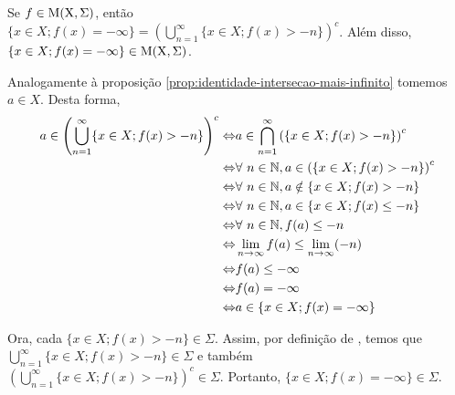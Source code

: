     \begin{proposition}
    \label{prop:identidade-união-menos-infinito}
        Se $f \in \operatorname{M(X, \Sigma)}$, então $\{x \in X; f(x) = -\infty\} = \displaystyle \left(\bigcup_{n = 1}^\infty \{x \in X; f(x) > - n\}\right)^c$.
        Além disso, $\{x \in X; f(x) = -\infty\} \in \operatorname{M(X, \Sigma)}$.
    \end{proposition}

    \begin{prova}
        Analogamente à proposição \ref{prop:identidade-intersecao-mais-infinito} tomemos $a \in X$. 
        Desta forma, 
        \begin{align*}
            a \in \left(\bigcup_{n = 1}^\infty \{x \in X; f(x) > - n\}\right)^c
            \Leftrightarrow & a \in \bigcap_{n = 1}^\infty \left(\{x \in X; f(x) > - n\}\right)^c\\
            \Leftrightarrow & \forall \ n \in \operatorname{\mathbb{N}}, a \in \left(\{x \in X; f(x) > - n\}\right)^c\\
            \Leftrightarrow & \forall \ n \in \operatorname{\mathbb{N}}, a \notin \{x \in X; f(x) > - n\}\\
            \Leftrightarrow & \forall \ n \in \operatorname{\mathbb{N}}, a \in \{x \in X; f(x) \leq - n\}\\
            \Leftrightarrow & \forall \ n \in \operatorname{\mathbb{N}}, f(a) \leq - n\\
            \Leftrightarrow & \lim_{n \to \infty} f(a) \leq \lim_{n \to \infty} (- n)\\            
            \Leftrightarrow & f(a) \leq -\infty\\            
            \Leftrightarrow & f(a) = -\infty\\            
            \Leftrightarrow & a \in \{x \in X; f(x) = -\infty\}            
        \end{align*}
        
    Ora, cada $\{x \in X; f(x) > - n\} \in \Sigma$.
    Assim, por definição de \sigal, temos que $\bigcup_{n = 1}^\infty \{x \in X; f(x) > - n\} \in \Sigma$ e também 
    $\left(\bigcup_{n = 1}^\infty \{x \in X; f(x) > - n\}\right)^c \in \Sigma$.
    Portanto, $\{x \in X; f(x) = -\infty\} \in \Sigma$. 
    \end{prova}

